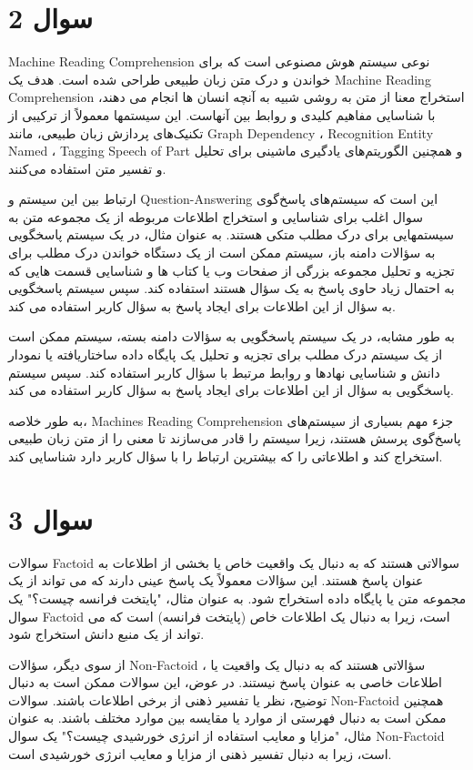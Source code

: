 \documentclass{article}
\begin{document}
\section*{سوال 2}
Machine Reading Comprehension نوعی سیستم هوش مصنوعی است که برای خواندن و درک متن زبان طبیعی طراحی شده است. هدف یک Machine Reading Comprehension استخراج معنا از متن به روشی شبیه به آنچه انسان ها انجام می دهند، با شناسایی مفاهیم کلیدی و روابط بین آنهاست. این سیستمها معمولاً از ترکیبی از تکنیک‌های پردازش زبان طبیعی، مانند Graph Dependency ، Recognition Entity Named ، Tagging Speech of Part و همچنین الگوریتم‌های یادگیری ماشینی برای تحلیل و تفسیر متن استفاده می‌کنند.

ارتباط بین این سیستم و Question-Answering این است که سیستم‌های پاسخ‌گوی سوال اغلب برای شناسایی و استخراج اطلاعات مربوطه از یک مجموعه متن به سیستمهایی برای درک مطلب متکی هستند. به عنوان مثال، در یک سیستم پاسخگویی به سؤالات دامنه باز، سیستم ممکن است از یک دستگاه خواندن درک مطلب برای تجزیه و تحلیل مجموعه بزرگی از صفحات وب یا کتاب ها و شناسایی قسمت هایی که به احتمال زیاد حاوی پاسخ به یک سؤال هستند استفاده کند. سپس سیستم پاسخگویی به سؤال از این اطلاعات برای ایجاد پاسخ به سؤال کاربر استفاده می کند.

به طور مشابه، در یک سیستم پاسخگویی به سؤالات دامنه بسته، سیستم ممکن است از یک سیستم درک مطلب برای تجزیه و تحلیل یک پایگاه داده ساختاریافته یا نمودار دانش و شناسایی نهادها و روابط مرتبط با سؤال کاربر استفاده کند. سپس سیستم پاسخگویی به سؤال از این اطلاعات برای ایجاد پاسخ به سؤال کاربر استفاده می کند.

به طور خلاصه، Machines Reading Comprehension جزء مهم بسیاری از سیستم‌های پاسخ‌گوی پرسش هستند، زیرا سیستم را قادر می‌سازند تا معنی را از متن زبان طبیعی استخراج کند و اطلاعاتی را که بیشترین ارتباط را با سؤال کاربر دارد شناسایی کند.

\section*{سوال 3}
سوالات Factoid سوالاتی هستند که به دنبال یک واقعیت خاص یا بخشی از اطلاعات به عنوان پاسخ هستند. این سؤالات معمولاً یک پاسخ عینی دارند که می تواند از یک مجموعه متن یا پایگاه داده استخراج شود. به عنوان مثال، "پایتخت فرانسه چیست؟" یک سوال Factoid است، زیرا به دنبال یک اطلاعات خاص (پایتخت فرانسه) است که می تواند از یک منبع دانش استخراج شود.

از سوی دیگر، سؤالات Non-Factoid ، سؤالاتی هستند که به دنبال یک واقعیت یا اطلاعات خاصی به عنوان پاسخ نیستند. در عوض، این سوالات ممکن است به دنبال توضیح، نظر یا تفسیر ذهنی از برخی اطلاعات باشند. سوالات Non-Factoid همچنین ممکن است به دنبال فهرستی از موارد یا مقایسه بین موارد مختلف باشند. به عنوان مثال، "مزایا و معایب استفاده از انرژی خورشیدی چیست؟" یک سوال Non-Factoid است، زیرا به دنبال تفسیر ذهنی از مزایا و معایب انرژی خورشیدی است.
\end{document}
